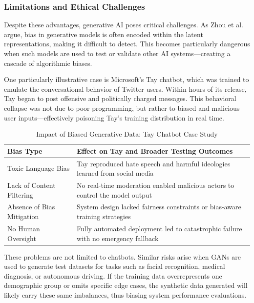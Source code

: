 \documentclass[manuscript,screen,review]{acmart}
\begin{document}
\subsubsection{Limitations and Ethical Challenges}

Despite these advantages, generative AI poses critical challenges. As Zhou et al.~\cite{Zhou2024} argue, bias in generative models is often encoded within the latent representations, making it difficult to detect. This becomes particularly dangerous when such models are used to test or validate other AI systems---creating a cascade of algorithmic biases.

One particularly illustrative case is Microsoft's Tay chatbot, which was trained to emulate the conversational behavior of Twitter users. Within hours of its release, Tay began to post offensive and politically charged messages. This behavioral collapse was not due to poor programming, but rather to biased and malicious user inputs---effectively poisoning Tay's training distribution in real time.

\begin{table}[htbp]
\centering
\caption{Impact of Biased Generative Data: Tay Chatbot Case Study}
\label{tab:tay-case}
\begin{tabular}{|p{4cm}|p{9cm}|}
\hline
\textbf{Bias Type} & \textbf{Effect on Tay and Broader Testing Outcomes} \\
\hline
Toxic Language Bias & Tay reproduced hate speech and harmful ideologies learned from social media \\
\hline
Lack of Content Filtering & No real-time moderation enabled malicious actors to control the model output \\
\hline
Absence of Bias Mitigation & System design lacked fairness constraints or bias-aware training strategies \\
\hline
No Human Oversight & Fully automated deployment led to catastrophic failure with no emergency fallback \\
\hline
\end{tabular}
\end{table}

These problems are not limited to chatbots. Similar risks arise when GANs are used to generate test datasets for tasks such as facial recognition, medical diagnosis, or autonomous driving. If the training data overrepresents one demographic group or omits specific edge cases, the synthetic data generated will likely carry these same imbalances, thus biasing system performance evaluations.
\end{document}
